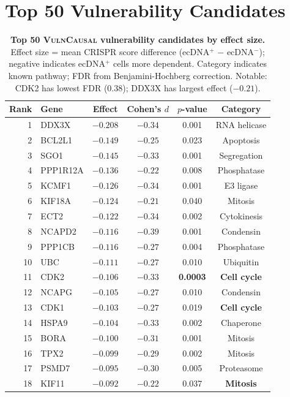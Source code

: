 \documentclass{article}
\newcommand{\vulncausal}{\textsc{VulnCausal}}
\begin{document}
\section{Top 50 Vulnerability Candidates}
\label{app:top_vulnerabilities}

\begin{table}[H]
\caption{\textbf{Top 50 \vulncausal{} vulnerability candidates by effect size.} Effect size = mean CRISPR score difference (ecDNA$^+$ $-$ ecDNA$^-$); negative indicates ecDNA$^+$ cells more dependent. Category indicates known pathway; FDR from Benjamini-Hochberg correction. Notable: CDK2 has lowest FDR (0.38); DDX3X has largest effect ($-0.21$).}
\label{tab:top_vuln}
\centering
\small
\begin{tabular}{@{}rlcccc@{}}
\toprule
Rank & Gene & Effect & Cohen's $d$ & $p$-value & Category \\
\midrule
1 & DDX3X & $-0.208$ & $-0.34$ & 0.001 & RNA helicase \\
2 & BCL2L1 & $-0.149$ & $-0.25$ & 0.023 & Apoptosis \\
3 & SGO1 & $-0.145$ & $-0.33$ & 0.001 & Segregation \\
4 & PPP1R12A & $-0.136$ & $-0.22$ & 0.008 & Phosphatase \\
5 & KCMF1 & $-0.126$ & $-0.34$ & 0.001 & E3 ligase \\
6 & KIF18A & $-0.124$ & $-0.21$ & 0.040 & Mitosis \\
7 & ECT2 & $-0.122$ & $-0.34$ & 0.002 & Cytokinesis \\
8 & NCAPD2 & $-0.116$ & $-0.39$ & 0.001 & Condensin \\
9 & PPP1CB & $-0.116$ & $-0.27$ & 0.004 & Phosphatase \\
10 & UBC & $-0.111$ & $-0.27$ & 0.010 & Ubiquitin \\
11 & CDK2 & $-0.106$ & $-0.33$ & \textbf{0.0003} & \textbf{Cell cycle} \\
12 & NCAPG & $-0.105$ & $-0.27$ & 0.010 & Condensin \\
13 & CDK1 & $-0.103$ & $-0.27$ & 0.019 & \textbf{Cell cycle} \\
14 & HSPA9 & $-0.104$ & $-0.33$ & 0.002 & Chaperone \\
15 & BORA & $-0.100$ & $-0.31$ & 0.001 & Mitosis \\
16 & TPX2 & $-0.099$ & $-0.29$ & 0.002 & Mitosis \\
17 & PSMD7 & $-0.095$ & $-0.30$ & 0.005 & Proteasome \\
18 & KIF11 & $-0.092$ & $-0.22$ & 0.037 & \textbf{Mitosis} \\

\end{tabular}
\end{table}
\end{document}

